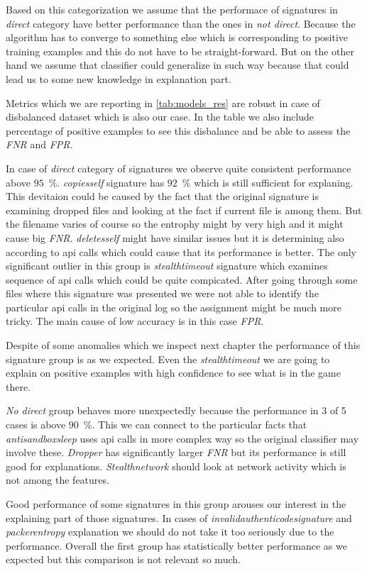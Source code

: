 Based on this categorization we assume that the performace of signatures in \emph{direct} category have better performance than the ones in \emph{not direct}. Because the algorithm has to converge to something else which is corresponding to positive training examples and this do not have to be straight-forward. But on the other hand we assume that classifier could generalize in such way because that could lead us to some new knowledge in explanation part.

Metrics which we are reporting in \ref{tab:models_res} are robust in case of disbalanced dataset which is also our case. In the table we also include percentage of positive examples to see this disbalance and be able to assess the \emph{FNR} and \emph{FPR}.

In case of \emph{direct} category of signatures we observe quite consistent performance above $95$~\%. \emph{copiesself} signature has $92$~\% which is still sufficient for explaning. This devitaion could be caused by the fact that the original signature is examining dropped files and looking at the fact if current file is among them. But the filename varies of course so the entrophy might by very high and it might cause big \emph{FNR}. \emph{deletesself} might have similar issues but it is determining also according to api calls which could cause that its performance is better. The only significant outlier in this group is \emph{stealthtimeout} signature which examines sequence of api calls which could be quite compicated. After going through some files where this signature was presented we were not able to identify the particular api calls in the original log so the assignment might be much more tricky. The main cause of low accuracy is in this case \emph{FPR}.

Despite of some anomalies which we inspect next chapter the performance of this signature group is as we expected. Even the \emph{stealthtimeout} we are going to explain on positive examples with high confidence to see what is in the game there.

\emph{No direct} group behaves more unexpectedly because the performance in 3 of 5 cases  is above $90$~\%. This we can connect to the particular facts that \emph{antisandboxsleep} uses api calls in more complex way so the original classifier may involve these. \emph{Dropper} has significantly larger \emph{FNR} but its performance is still good for explanations. \emph{Stealthnetwork} should look at network activity which is not among the features.

Good performance of some signatures in this group arouses our interest in the explaining part of those signatures. In cases of \emph{invalidauthenticodesignature} and \emph{packerentropy} explanation we should do not take it too seriously due to the performance. Overall the first group has statistically better performance as we expected but this comparison is not relevant so much.


